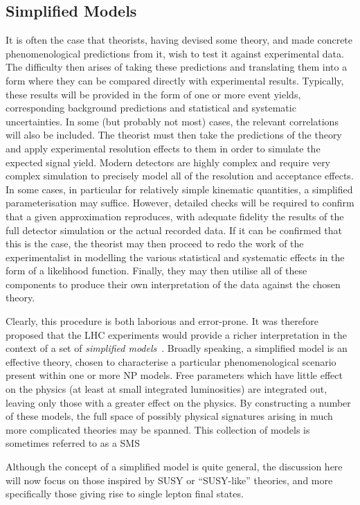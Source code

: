 \subsection{Simplified Models}
\label{sec:sms}
It is often the case that theorists, having devised some theory, and made
concrete phenomenological predictions from it, wish to test it against
experimental data. The difficulty then arises of taking these predictions and
translating them into a form where they can be compared directly with
experimental results. Typically, these results will be provided in the form of
one or more event yields, corresponding background predictions and statistical
and systematic uncertainties. In some (but probably not most) cases, the
relevant correlations will also be included. The theorist must then take the
predictions of the theory and apply experimental resolution effects to them in
order to simulate the expected signal yield. Modern detectors are highly complex
and require very complex simulation to precisely model all of the resolution and
acceptance effects. In some cases, in particular for relatively simple kinematic
quantities, a simplified parameterisation may suffice. However, detailed checks
will be required to confirm that a given approximation reproduces, with adequate
fidelity the results of the full detector simulation or the actual recorded
data. If it can be confirmed that this is the case, the theorist may then
proceed to redo the work of the experimentalist in modelling the various
statistical and systematic effects in the form of a likelihood
function. Finally, they may then utilise all of these components to produce
their own interpretation of the data against the chosen theory.

Clearly, this procedure is both laborious and error-prone. It was therefore
proposed that the \ac{LHC} experiments would provide a richer interpretation in
the context of a set of \emph{simplified models}~\cite{alwall_simplified}. Broadly
speaking, a simplified model is an effective theory, chosen to characterise a
particular phenomenological scenario present within one or more \ac{NP}
models. Free parameters which have little effect on the physics (at least at
small integrated luminosities) are integrated out, leaving only those with a
greater effect on the physics. By constructing a number of these models, the
full space of possibly physical signatures arising in much more complicated
theories may be spanned. This collection of models is sometimes referred to as a
\acf{SMS}

Although the concept of a simplified model is quite general, the discussion here
will now focus on those inspired by \ac{SUSY} or ``\ac{SUSY}-like'' theories,
and more specifically those giving rise to single lepton final states.

